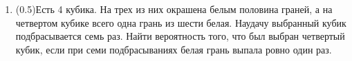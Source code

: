 \documentclass[a4paper, 14pt]{extarticle}
\begin{document}
\begin{enumerate}
	\item (0.5)Есть 4 кубика. На трех из них окрашена белым половина граней, а на четвертом кубике всего одна грань из шести белая. Наудачу выбранный кубик подбрасывается семь раз. Найти вероятность того, что был выбран четвертый кубик, если при семи подбрасываниях белая грань выпала ровно один раз. 
\end{enumerate}
\end{document}
